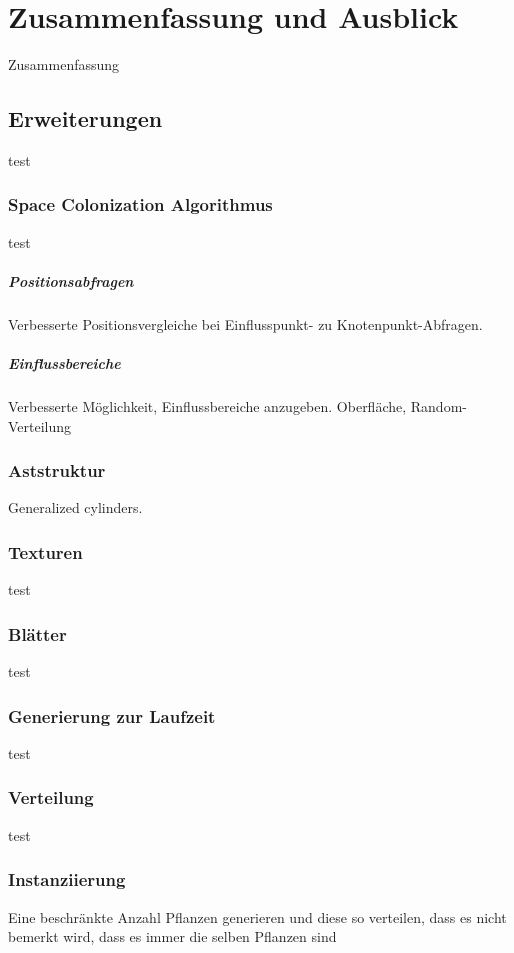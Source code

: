 \chapter{Zusammenfassung und Ausblick}

Zusammenfassung

\section{Erweiterungen}
test
\subsection{Space Colonization Algorithmus}
test
\paragraph{Positionsabfragen}
Verbesserte Positionsvergleiche bei Einflusspunkt- zu Knotenpunkt-Abfragen.

\paragraph{Einflussbereiche} 
Verbesserte Möglichkeit, Einflussbereiche anzugeben. Oberfläche, Random-Verteilung

\subsection{Aststruktur}

Generalized cylinders.

\subsection{Texturen}
test
\subsection{Blätter}
test
\subsection{Generierung zur Laufzeit}
test
\subsection{Verteilung}
test
\subsection{Instanziierung}
Eine beschränkte Anzahl Pflanzen generieren und diese so verteilen, dass es nicht bemerkt wird, dass es immer die selben Pflanzen sind

